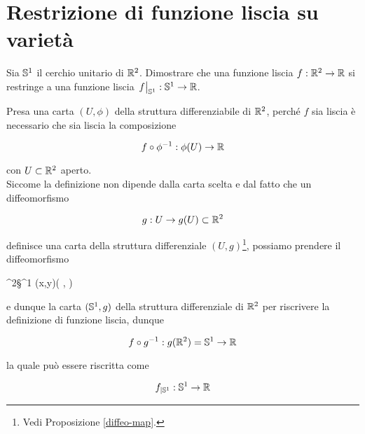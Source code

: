 %

\newpage

%

\section{Restrizione di funzione liscia su varietà}\label{es2-7}

\begin{tcolorbox}
	Sia $ \S^{1} $ il cerchio unitario di $ \R^{2} $. Dimostrare che una funzione liscia $ f : \R^{2} \to \R $ si restringe a una funzione liscia $ \eval{f}_{\S^{1}} : \S^{1} \to \R $.
\end{tcolorbox}

Presa una carta $ (U,\phi) $ della struttura differenziabile di $ \R^{2} $, perché $ f $ sia liscia è necessario che sia liscia la composizione

\begin{equation}
	f \circ \phi^{-1} : \phi(U) \to \R
\end{equation}

con $ U \subset \R^{2} $ aperto.\\
Siccome la definizione non dipende dalla carta scelta e dal fatto che un diffeomorfismo

\begin{equation}
	g : U \to g(U) \subset \R^{2}
\end{equation}

definisce una carta della struttura differenziale $ (U,g) $\footnote{%
	Vedi Proposizione \ref{diffeo-map}.%
}, possiamo prendere il diffeomorfismo

	{\R^{2}}{\S^{1}}
	{(x,y)}{\left( , \right)}

e dunque la carta $ (\S^{1},g) $ della struttura differenziale di $ \R^{2} $ per riscrivere la definizione di funzione liscia, dunque

\begin{equation}
	f \circ g^{-1} : g(\R^{2}) = \S^{1} \to \R
\end{equation}

la quale può essere riscritta come

\begin{equation}
	f_{|\S^{1}} : \S^{1} \to \R
\end{equation}

%

\newpage

%

